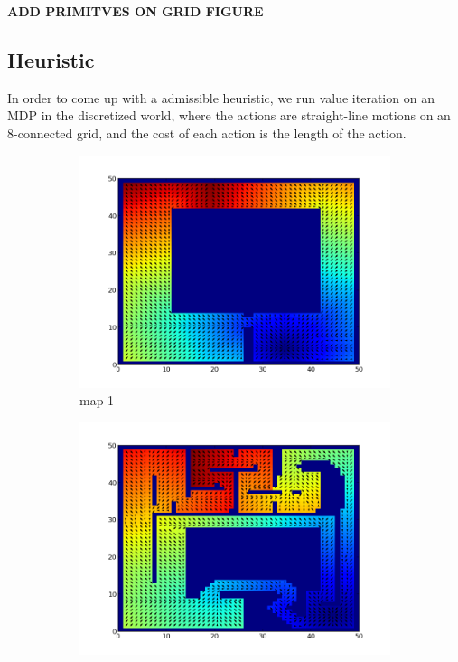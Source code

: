 \documentclass{article}
\begin{document}
\textbf{ADD PRIMITVES ON GRID FIGURE}

\subsection{Heuristic}

In order to come up with a admissible heuristic, we run value iteration on an MDP in the discretized world, where the actions are straight-line motions on an 8-connected grid, and the cost of each action is the length of the action. 
 
\begin{figure}[h]
    \centering
    \begin{subfigure}[b]{0.45\textwidth}
        \includegraphics[width = \textwidth]{map1value.png}
        \caption{map 1}
        \label{fig:map1value}
    \end{subfigure}
    \begin{subfigure}[b]{0.45\textwidth}
        \includegraphics[width = \textwidth]{map2value.png}

\end{subfigure}
\end{figure}
\end{document}
